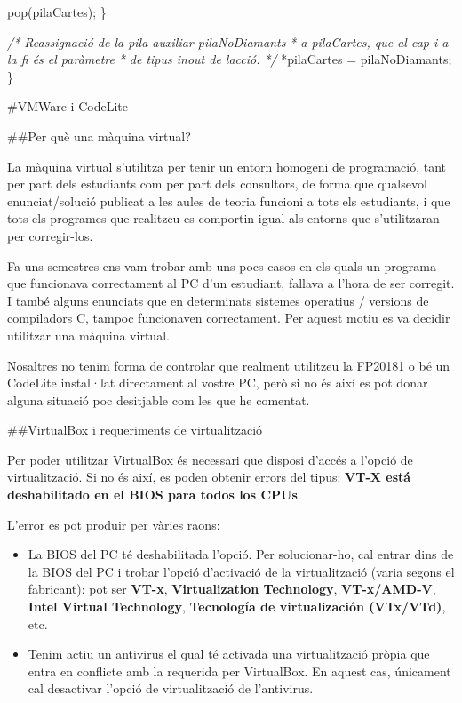 \documentclass[]{book}
\newenvironment{Shaded}{\begin{snugshade}}{\end{snugshade}}
\newcommand{\CommentTok}[1]{\textcolor[rgb]{0.56,0.35,0.01}{\textit{#1}}}
\newcommand{\NormalTok}[1]{#1}
\providecommand{\tightlist}{%
  \setlength{\itemsep}{0pt}\setlength{\parskip}{0pt}}
\begin{document}
\begin{Shaded}
\begin{Highlighting}[]
\NormalTok{        pop(pilaCartes);}
\NormalTok{    \}}
    
    \CommentTok{/* Reassignació de la pila auxiliar pilaNoDiamants}
\CommentTok{     * a pilaCartes, que al cap i a la fi és el paràmetre}
\CommentTok{     * de tipus inout de l\textquotesingle{}acció. }
\CommentTok{     */}
\NormalTok{    *pilaCartes = pilaNoDiamants;}
\NormalTok{\}}
\end{Highlighting}
\end{Shaded}

\#VMWare i CodeLite

\#\#Per què una màquina virtual?

La màquina virtual s'utilitza per tenir un entorn homogeni de programació, tant per part dels estudiants com per part dels consultors, de forma que qualsevol enunciat/solució publicat a les aules de teoria funcioni a tots els estudiants, i que tots els programes que realitzeu es comportin igual als entorns que s'utilitzaran per corregir-los.

Fa uns semestres ens vam trobar amb uns pocs casos en els quals un programa que funcionava correctament al PC d'un estudiant, fallava a l'hora de ser corregit. I també alguns enunciats que en determinats sistemes operatius / versions de compiladors C, tampoc funcionaven correctament. Per aquest motiu es va decidir utilitzar una màquina virtual.

Nosaltres no tenim forma de controlar que realment utilitzeu la FP20181 o bé un CodeLite instal·lat directament al vostre PC, però si no és així es pot donar alguna situació poc desitjable com les que he comentat.

\#\#VirtualBox i requeriments de virtualització

Per poder utilitzar VirtualBox és necessari que disposi d'accés a l'opció de virtualització. Si no és així, es poden obtenir errors del tipus: \textbf{VT-X está deshabilitado en el BIOS para todos los CPUs}.

L'error es pot produir per vàries raons:

\begin{itemize}
\tightlist
\item
  La BIOS del PC té deshabilitada l'opció. Per solucionar-ho, cal entrar dins de la BIOS del PC i trobar l'opció d'activació de la virtualització (varia segons el fabricant): pot ser \textbf{VT-x}, \textbf{Virtualization Technology}, \textbf{VT-x/AMD-V}, \textbf{Intel Virtual Technology}, \textbf{Tecnología de virtualización (VTx/VTd)}, etc.
\item
  Tenim actiu un antivirus el qual té activada una virtualització pròpia que entra en conflicte amb la requerida per VirtualBox. En aquest cas, únicament cal desactivar l'opció de virtualització de l'antivirus.
\end{itemize}
\end{document}
